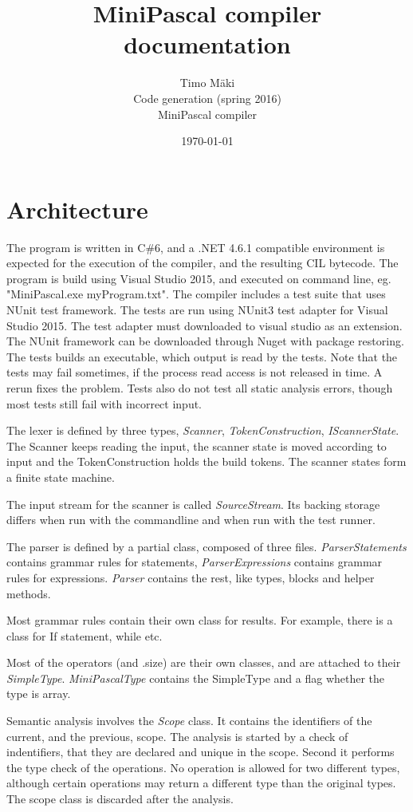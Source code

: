 \documentclass[english]{article}
\title{MiniPascal compiler documentation}
\author{Timo Mäki
\\Code generation (spring 2016)
\\MiniPascal compiler}
\date{\today}
\begin{document}
\maketitle

\section{Architecture}
The program is written in C\#6, and a .NET 4.6.1 compatible environment is expected for the execution of the compiler, and the resulting CIL bytecode.
The program is build using Visual Studio 2015, and executed on command line, eg. "MiniPascal.exe myProgram.txt".
The compiler includes a test suite that uses NUnit test framework.
The tests are run using NUnit3 test adapter for Visual Studio 2015.
The test adapter must downloaded to visual studio as an extension.
The NUnit framework can be downloaded through Nuget with package restoring.
The tests builds an executable, which output is read by the tests.
Note that the tests may fail sometimes, if the process read access is not released in time.
A rerun fixes the problem.
Tests also do not test all static analysis errors, though most tests still fail with incorrect input.

The lexer is defined by three types, \emph{Scanner}, \emph{TokenConstruction}, \emph{IScannerState}.
The Scanner keeps reading the input, the scanner state is moved according to input and the TokenConstruction holds the build tokens.
The scanner states form a finite state machine.

The input stream for the scanner is called \emph{SourceStream}.
Its backing storage differs when run with the commandline and when run with the test runner.

The parser is defined by a partial class, composed of three files.
\emph{ParserStatements} contains grammar rules for statements, \emph{ParserExpressions} contains grammar rules for expressions.
\emph{Parser} contains the rest, like types, blocks and helper methods.

Most grammar rules contain their own class for results.
For example, there is a class for If statement, while etc.

Most of the operators (and .size) are their own classes, and are attached to their \emph{SimpleType}.
\emph{MiniPascalType} contains the SimpleType and a flag whether the type is array.

Semantic analysis involves the \emph{Scope} class.
It contains the identifiers of the current, and the previous, scope.
The analysis is started by a check of indentifiers, that they are declared and unique in the scope.
Second it performs the type check of the operations.
No operation is allowed for two different types, although certain operations may return a different type than the original types.
The scope class is discarded after the analysis.
\end{document}
